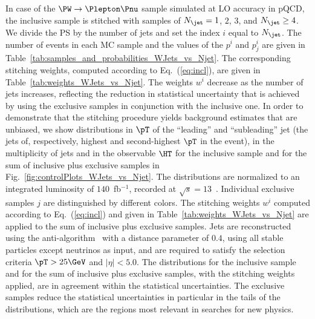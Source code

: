 In case of the $\PW \to \Plepton\Pnu$ sample simulated at LO accuracy in pQCD,
the inclusive sample is stitched with samples of $N_{\jet} = 1$, $2$, $3$, and $N_{\jet} \geq 4$.
We divide the PS by the number of jets and set the index $i$ equal to $N_{\jet}$.
The number of events in each MC sample and the values of the $p^{i}$ and $p_{j}^{i}$ are given in Table~\ref{tab:samples_and_probabilities_WJets_vs_Njet}.
The corresponding stitching weights, computed according to Eq.~(\ref{eq:incl}), are given in Table~\ref{tab:weights_WJets_vs_Njet}.
The weights $w^{i}$ decrease as the number of jets increases, 
reflecting the reduction in statistical uncertainty that is achieved by using the exclusive samples in conjunction with the inclusive one.
In order to demonstrate that the stitching procedure yields background estimates that are unbiased,
we show distributions in $\pT$ of the ``leading'' and ``subleading'' jet (the jets of, respectively, highest and second-highest $\pT$ in the event),
in the multiplicity of jets and in the observable $\HT$ 
for the inclusive sample and for the sum of inclusive plus exclusive samples in Fig.~\ref{fig:controlPlots_WJets_vs_Njet}.
The distributions are normalized to an integrated luminosity of $140$~fb$^{-1}$, recorded at $\sqrt{s}=13$~\TeV.
Individual exclusive samples $j$ are distinguished by different colors.
The stitching weights $w^{i}$ computed according to Eq.~(\ref{eq:incl}) and given in Table~\ref{tab:weights_WJets_vs_Njet} are applied to the sum of inclusive plus exclusive samples.
Jets are reconstructed using the anti-\kT algorithm~\cite{Cacciari:2008gp,Cacciari:2011ma} with a distance parameter of $0.4$,
using all stable particles except neutrinos as input, and are required to satisfy the selection criteria $\pT > 25\GeV$ and $\vert\eta\vert < 5.0$.
The distributions for the inclusive sample and for the sum of inclusive plus exclusive samples, with the stitching weights applied, are in agreement within the statistical uncertainties.
The exclusive samples reduce the statistical uncertainties in particular in the tails of the distributions,
which are the regions most relevant in searches for new physics.

